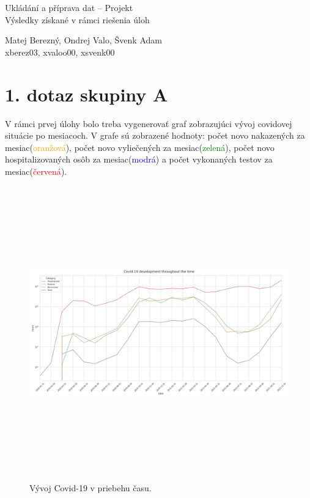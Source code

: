 \documentclass[a4paper, 16pt]{article}
\begin{document}
    			\begin{center}
				{\LARGE
					Ukládání a příprava dat -- Projekt \\
					{\Large
					    Výsledky získané v rámci riešenia úloh \\[5mm]
					}
				}
				{\large
					Matej Berezný, Ondrej Valo, Švenk Adam \\	{\small xberez03, xvaloo00, xsvenk00}
					
				}
			\end{center}
			\vspace{0.7cm}

\section{1. dotaz skupiny A}

V rámci prvej úlohy bolo treba vygenerovať graf zobrazujúci vývoj covidovej situácie po mesiacoch. V grafe sú zobrazené hodnoty: počet novo nakazených za mesiac(\textcolor{orange}{oranžová}), počet novo vyliečených za mesiac(\textcolor{green}{zelená}), počet novo hospitalizovaných osôb za mesiac(\textcolor{blue}{modrá}) a počet vykonaných testov za mesiac(\textcolor{red}{červená}).
\begin{figure}[H] \centering
    \includegraphics[width=\linewidth,height=5in]{Q1.png}
    \caption{Vývoj Covid-19 v priebehu času.}
    \label{graf_1}
\end{figure}
\end{document}
